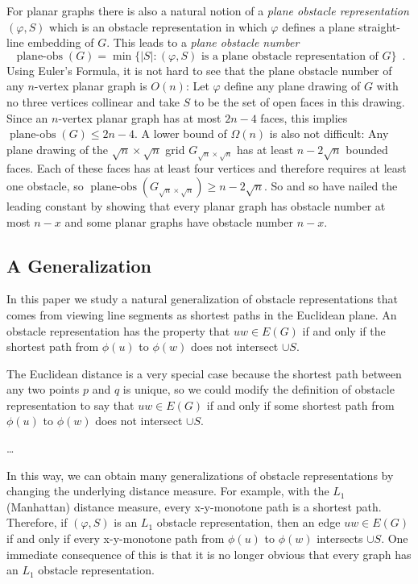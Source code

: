 \documentclass{patmorin}
\DeclareMathOperator{\planeobs}{plane-obs}
\begin{document}
For planar graphs there is also a natural notion of a \emph{plane obstacle
representation} $(\varphi, S)$ which is an obstacle representation
in which $\varphi$ defines a plane straight-line embedding of $G$.
This leads to a \emph{plane obstacle number}
\[
    \planeobs(G) = \min\{|S| :\text{$(\varphi, S)$ is a plane obstacle
        representation of $G$}\} \enspace .
\]
Using Euler's Formula, it is not hard to see that the plane obstacle
number of any $n$-vertex planar graph is $O(n)$: Let $\varphi$ define
any plane drawing of $G$ with no three vertices collinear and take $S$
to be the set of open faces in this drawing.  Since an $n$-vertex planar
graph has at most $2n-4$ faces, this implies $\planeobs(G)\le 2n-4$.
A lower bound of $\Omega(n)$ is also not difficult:  Any plane drawing
of the $\sqrt{n}\times\sqrt{n}$ grid $G_{\sqrt{n}\times\sqrt{n}}$
has at least $n-2\sqrt{n}$ bounded faces. Each of these faces has
at least four vertices and therefore requires at least one obstacle,
so $\planeobs(G_{\sqrt{n}\times\sqrt{n}})\ge n-2\sqrt{n}$.  So and so
\cite{X} have nailed the leading constant by showing that every planar
graph has obstacle number at most $n-x$ and some planar graphs have
obstacle number $n-x$.

\subsection{A Generalization}

In this paper we study a natural generalization of obstacle
representations that comes from viewing line segments as shortest paths
in the Euclidean plane.  An obstacle representation has the property that
$uw\in E(G)$ if and only if the shortest path from $\phi(u)$ to $\phi(w)$
does not intersect $\cup S$.

The Euclidean distance is a very special case because the shortest path
between any two points $p$ and $q$ is unique, so we could modify the
definition of obstacle representation to say that $uw\in E(G)$ if and
only if some shortest path from $\phi(u)$ to $\phi(w)$ does not intersect
$\cup S$.

\ldots

In this way, we can obtain many generalizations of obstacle
representations by changing the underlying distance measure.  For example,
with the $L_1$ (Manhattan) distance measure, every x-y-monotone
path is a shortest path.  Therefore, if $(\varphi,S)$ is an $L_1$
obstacle representation, then an edge $uw\in E(G)$ if and only if every
x-y-monotone path from $\phi(u)$ to $\phi(w)$ intersects $\cup S$.  One
immediate consequence of this is that it is
no longer obvious that every graph has an $L_1$ obstacle representation.
\end{document}
